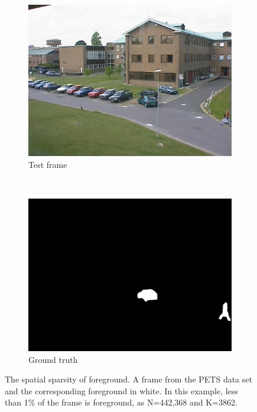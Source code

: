 \begin{figure}
        \centering
        \begin{subfigure}[b]{0.2\textwidth}
                \centering
                \includegraphics[width=\textwidth]{camReal}
                \caption{Test frame}
        \end{subfigure}%
        ~ %
        \begin{subfigure}[b]{0.2\textwidth}
                \centering
                \includegraphics[width=\textwidth]{camGT}
                \caption{Ground truth}
        \end{subfigure}
\caption{The spatial sparsity of foreground. A frame from the PETS data set  \cite{pets2001} and the corresponding foreground in white. In this example, less than 1\% of the frame is foreground, as N=442,368 and K=3862.  }\label{fig:sparse}
\end{figure}

